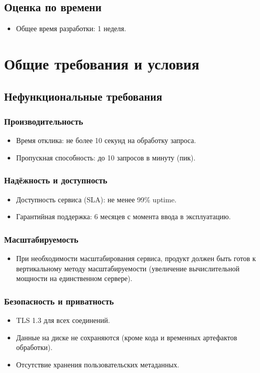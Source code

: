 \documentclass[12pt]{article}
\begin{document}
\subsection{Оценка по времени}
\begin{itemize}
	\item Общее время разработки: 1 неделя.
\end{itemize}


\section{Общие требования и условия}

\subsection{Нефункциональные требования}

\subsubsection{Производительность}
\begin{itemize}
	\item Время отклика: не более 10 секунд на обработку запроса.
	\item Пропускная способность: до 10 запросов в минуту (пик).
\end{itemize}

\subsubsection{Надёжность и доступность}
\begin{itemize}
	\item Доступность сервиса (SLA): не менее 99\% uptime.
	\item Гарантийная поддержка: 6 месяцев с момента ввода в эксплуатацию.
\end{itemize}

\subsubsection{Масштабируемость}
\begin{itemize}
	\item При необходимости масштабирования сервиса, продукт должен быть готов к вертикальному методу масштабируемости (увеличение вычислительной мощности на единственном сервере).
\end{itemize}

\subsubsection{Безопасность и приватность}
\begin{itemize}
	\item TLS 1.3 для всех соединений.
	\item Данные на диске не сохраняются (кроме кода и временных артефактов обработки).
	\item Отсутствие хранения пользовательских метаданных.
\end{itemize}
\end{document}
